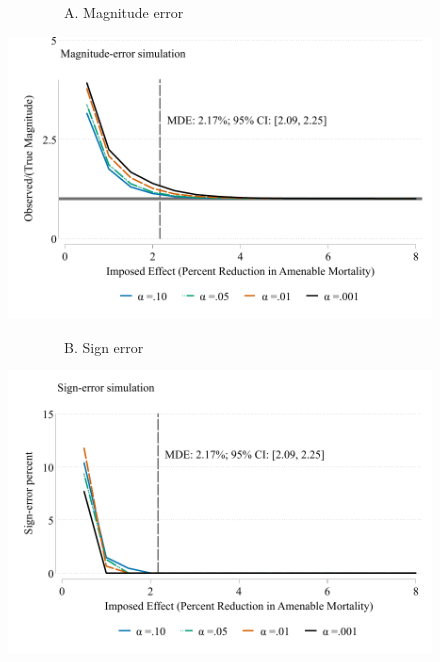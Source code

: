 \documentclass[12pt]{article}%
\begin{document}
    
 \begin{figure}[]
    \begin{minipage}{\linewidth}
    \begin{minipage}{.49\linewidth}
            \begin{flushleft}
            ~~~~~~~~A. Magnitude error \\
        \end{flushleft}
      \includegraphics[width=\linewidth]{../output/figures/magnitude_error_st_ddd_ln_amen_none_cluster_state_weight_attpop_controls_yes_preperiod_2001_2010.pdf}  
    \end{minipage}
    \begin{minipage}{.49\linewidth}
            \begin{flushleft}
            ~~~~~~~~B. Sign error \\
        \end{flushleft}
      \includegraphics[width=\linewidth]{../output/figures/sign_error_st_ddd_ln_amen_none_cluster_state_weight_attpop_controls_yes_preperiod_2001_2010.pdf}  

\end{minipage}
\end{minipage}
\end{figure}
\end{document}
